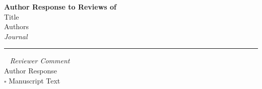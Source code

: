 \providecommand{\lettertitle}{Author Response to Reviews of}
\providecommand{\papertitle}{Title}
\providecommand{\authors}{Authors}
\providecommand{\journal}{Journal}





{\Large\bf \lettertitle}\\[1em]
{\huge \papertitle}\\[1em]
{\authors}\\
{\emph{\journal}}\\
\hrule


\begin{flushright}
\vspace{-1em}
\vline ~ \emph{Reviewer Comment} \\
Author Response \\
$\square$ Manuscript Text
\end{flushright}
